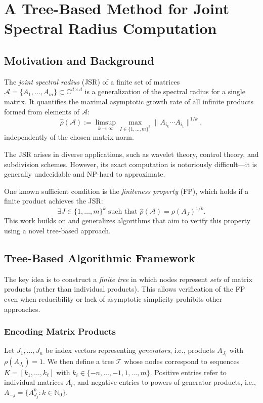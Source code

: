 \chapter{A Tree-Based Method for Joint Spectral Radius Computation}

\section{Motivation and Background}

The \emph{joint spectral radius} (JSR) of a finite set of matrices $\mathcal{A} = \{A_1, \dots, A_m\} \subset \mathbb{C}^{d \times d}$ is a generalization of the spectral radius for a single matrix. It quantifies the maximal asymptotic growth rate of all infinite products formed from elements of $\mathcal{A}$:
\[
\hat{\rho}(\mathcal{A}) := \limsup_{k \to \infty} \max_{I \in \{1, \dots, m\}^k} \|A_{i_k} \cdots A_{i_1}\|^{1/k},
\]
independently of the chosen matrix norm.

The JSR arises in diverse applications, such as wavelet theory, control theory, and subdivision schemes. However, its exact computation is notoriously difficult—it is generally undecidable and NP-hard to approximate.

One known sufficient condition is the \emph{finiteness property} (FP), which holds if a finite product achieves the JSR:
\[
\exists J \in \{1, \dots, m\}^k \text{ such that } \hat{\rho}(\mathcal{A}) = \rho(A_J)^{1/k}.
\]
This work builds on and generalizes algorithms that aim to verify this property using a novel tree-based approach.

\section{Tree-Based Algorithmic Framework}

The key idea is to construct a \emph{finite tree} in which nodes represent \emph{sets} of matrix products (rather than individual products). This allows verification of the FP even when reducibility or lack of asymptotic simplicity prohibits other approaches.

\subsection{Encoding Matrix Products}

Let $J_1, \dots, J_n$ be index vectors representing \emph{generators}, i.e., products $A_{J_i}$ with $\rho(A_{J_i}) = 1$. We then define a tree $\mathcal{T}$ whose nodes correspond to sequences $K = [k_1, \dots, k_\ell]$ with $k_i \in \{-n, \dots, -1, 1, \dots, m\}$. Positive entries refer to individual matrices $A_i$, and negative entries to powers of generator products, i.e., $A_{-j} = \{A_{J_j}^k : k \in \mathbb{N}_0\}$.

